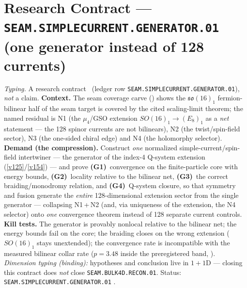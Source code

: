 \section*{Research Contract --- \texttt{SEAM.SIMPLECURRENT.GENERATOR.01} (one generator instead of 128 currents)}
\noindent\emph{Typing.} A research contract \mO\ (ledger row
\texttt{SEAM.SIMPLECURRENT.GENERATOR.01}), \emph{not} a claim.  \textbf{Context.}  The seam
coverage carve () shows the $\mathfrak{so}(16)_1$
fermion-bilinear half of the seam target is covered by the cited scaling-limit theorem; the
named residual is N1 (the $\mu_4$/GSO extension $SO(16)_1\to(E_8)_1$ as a \emph{net} statement
--- the 128 spinor currents are not bilinears), N2 (the twist/spin-field sector), N3 (the
one-sided chiral edge) and N4 (the holomorphy selector).  \textbf{Demand (the compression).}
Construct \emph{one} normalized simple-current/spin-field intertwiner --- the generator of the
index-4 Q-system extension (\vref{v125}/\vref{v154}) --- and prove
\textbf{(G1)}~convergence on the finite-particle core with energy bounds,
\textbf{(G2)}~locality relative to the bilinear net,
\textbf{(G3)}~the correct braiding/monodromy relation, and
\textbf{(G4)}~Q-system closure,
so that symmetry and fusion generate the \emph{entire} 128-dimensional extension sector from the
single generator --- collapsing N1\,+\,N2 (and, via uniqueness of the extension, the N4
selector) onto \emph{one} convergence theorem instead of 128 separate current controls.
\textbf{Kill tests.}  The generator is provably nonlocal relative to the bilinear net; the
energy bounds fail on the core; the braiding closes on the wrong extension ($SO(16)_1$ stays
unextended); the convergence rate is incompatible with the measured bilinear collar rate
($p=3.48$ inside the preregistered band, ).
\emph{Dimension typing (binding):} hypotheses and conclusion live in $1{+}1$D --- closing this
contract does \emph{not} close \texttt{SEAM.BULK4D.RECON.01}.  Status:
\texttt{SEAM.SIMPLECURRENT.GENERATOR.01} \mO.

